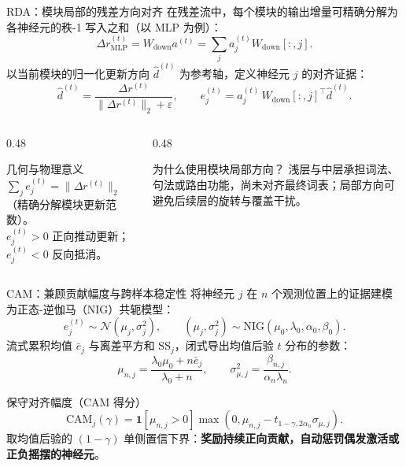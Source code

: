 \documentclass{beamer}
\begin{document}
\begin{frame}{RDA：模块局部的残差方向对齐}
    \small
    在残差流中，每个模块的输出增量可精确分解为各神经元的秩-1 写入之和（以 MLP 为例）：
    \begin{equation*}
        \Delta r_{\mathrm{MLP}}^{(t)} = W_{\mathrm{down}}a^{(t)}
        = \sum_j a_j^{(t)}W_{\mathrm{down}}[:,j].
    \end{equation*}
    以当前模块的归一化更新方向 $\hat d^{(t)}$ 为参考轴，定义神经元 $j$ 的对齐证据：
    \begin{equation*}
        \hat d^{(t)} = \frac{\Delta r^{(t)}}{\lVert\Delta r^{(t)}\rVert_2+\varepsilon},
        \qquad
        e_j^{(t)} = a_j^{(t)}\,W_{\mathrm{down}}[:,j]^\top\hat d^{(t)}.
    \end{equation*}
    \begin{columns}[T]
        \begin{column}{0.48\textwidth}
            \begin{alertblock}{几何与物理意义}\scriptsize
                $\sum_j e_j^{(t)} = \lVert\Delta r^{(t)}\rVert_2$（精确分解模块更新范数）。\\
                $e_j^{(t)}>0$ 正向推动更新；$e_j^{(t)}<0$ 反向抵消。
            \end{alertblock}
        \end{column}
        \begin{column}{0.48\textwidth}
            \begin{exampleblock}{为什么使用模块局部方向？}\scriptsize
                浅层与中层承担词法、句法或路由功能，尚未对齐最终词表；局部方向可避免后续层的旋转与覆盖干扰。
            \end{exampleblock}
        \end{column}
    \end{columns}
\end{frame}

\begin{frame}{CAM：兼顾贡献幅度与跨样本稳定性}
    将神经元 $j$ 在 $n$ 个观测位置上的证据建模为正态-逆伽马（NIG）共轭模型：
    \begin{equation*}
        e_j^{(t)}\sim\mathcal N(\mu_j,\sigma_j^2),\qquad
        (\mu_j,\sigma_j^2)\sim\mathrm{NIG}(\mu_0,\lambda_0,\alpha_0,\beta_0).
    \end{equation*}
    流式累积均值 $\bar e_j$ 与离差平方和 $\mathrm{SS}_j$，闭式导出均值后验 $t$ 分布的参数：
    \begin{equation*}
        \mu_{n,j}=\frac{\lambda_0\mu_0+n\bar e_j}{\lambda_0+n},
        \qquad
        \sigma_{\mu,j}^2=\frac{\beta_{n,j}}{\alpha_n\lambda_n}.
    \end{equation*}
    \begin{block}{保守对齐幅度（CAM 得分）}
        \begin{equation*}
            \mathrm{CAM}_j(\gamma)=\mathbf 1[\mu_{n,j}>0]
            \max\!\left(0,\mu_{n,j}-t_{1-\gamma,2\alpha_n}\sigma_{\mu,j}\right).
        \end{equation*}
        取均值后验的 $(1-\gamma)$ 单侧置信下界：\textbf{奖励持续正向贡献，自动惩罚偶发激活或正负摇摆的神经元}。
    \end{block}
\end{frame}
\end{document}
